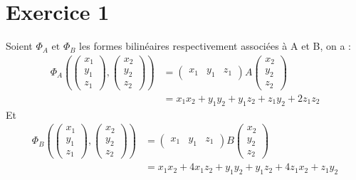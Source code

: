 \documentclass[td4.tex]{subfiles}
\begin{document}
\section{Exercice 1}
Soient $\Phi_A \text{ et } \Phi_B$ les formes bilinéaires respectivement associées à A et B, on a :
\begin{align*}
  \Phi_A(\begin{pmatrix}x_1 \\ y_1 \\ z_1 \end{pmatrix}, \begin{pmatrix}x_2 \\ y_2 \\ z_2 \end{pmatrix} )
  &= \begin{pmatrix}x_1 & y_1 & z_1\end{pmatrix} A \begin{pmatrix} x_2 \\ y_2 \\ z_2 \end{pmatrix} \\
  &=x_1 x_2 + y_1 y_2 + y_1 z_2 + z_1 y_2 + 2z_1 z_2 
\end{align*}
Et
\begin{align*}
  \Phi_B(\begin{pmatrix}x_1 \\ y_1 \\ z_1 \end{pmatrix}, \begin{pmatrix}x_2 \\ y_2 \\ z_2 \end{pmatrix} )
  &= \begin{pmatrix}x_1 & y_1 & z_1\end{pmatrix} B \begin{pmatrix} x_2 \\ y_2 \\ z_2 \end{pmatrix} \\
  &= x_1 x_2 + 4x_1 z_2 + y_1 y_2 + y_1 z_2 + 4z_1 x_2 + z_1 y_2
\end{align*}
\end{document}
